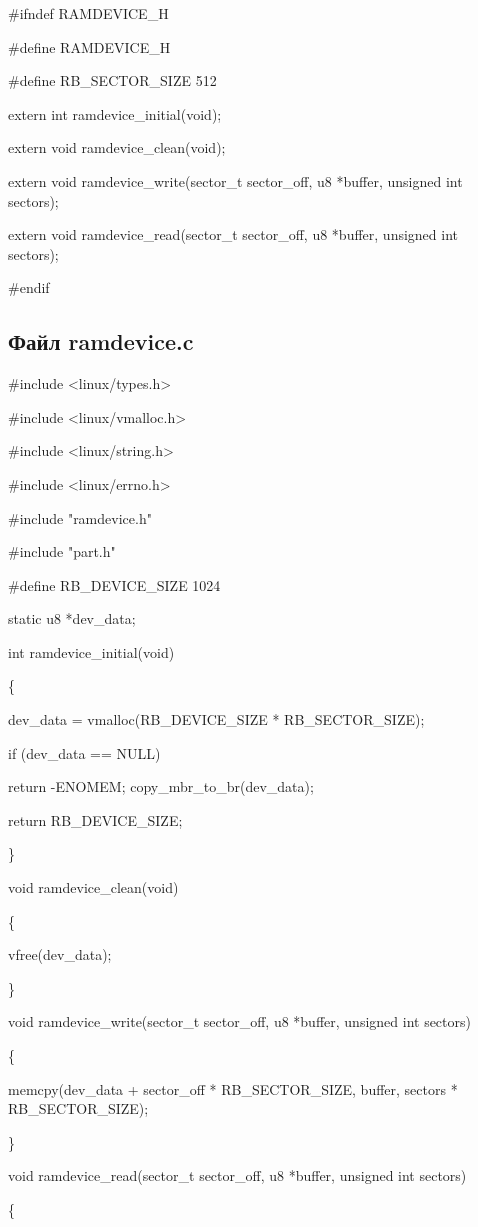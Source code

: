 \documentclass[11pt]{article}
\begin{document}
\#ifndef RAMDEVICE\_H

\#define RAMDEVICE\_H

\#define RB\_SECTOR\_SIZE 512

extern int ramdevice\_initial(void);

extern void ramdevice\_clean(void);

extern void ramdevice\_write(sector\_t sector\_off, u8 *buffer, unsigned int sectors);

extern void ramdevice\_read(sector\_t sector\_off, u8 *buffer, unsigned int sectors);

\#endif

\subsection{Файл ramdevice.c}

\#include <linux/types.h>

\#include <linux/vmalloc.h>

\#include <linux/string.h>

\#include <linux/errno.h>

\#include "ramdevice.h"

\#include "part.h"

\#define RB\_DEVICE\_SIZE 1024 

static u8 *dev\_data;

int ramdevice\_initial(void)

\{

	dev\_data = vmalloc(RB\_DEVICE\_SIZE * RB\_SECTOR\_SIZE);
	
	if (dev\_data == NULL)
	
		return -ENOMEM;
	copy\_mbr\_to\_br(dev\_data);
	
	return RB\_DEVICE\_SIZE;
	
\}

void ramdevice\_clean(void)

\{

	vfree(dev\_data);
	
\}

void ramdevice\_write(sector\_t sector\_off, u8 *buffer, unsigned int sectors)

\{

	memcpy(dev\_data + sector\_off * RB\_SECTOR\_SIZE, buffer,
		sectors * RB\_SECTOR\_SIZE);
		
\}

void ramdevice\_read(sector\_t sector\_off, u8 *buffer, unsigned int sectors)

\{
\end{document}
